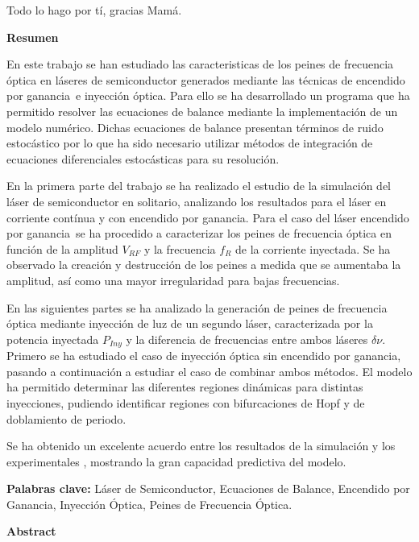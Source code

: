 \documentclass[a4paper, 11pt, oneside]{book}
\newcommand{\gs}{encendido por ganancia}
\begin{document}
				Todo lo hago por tí, gracias Mamá.

			\newpage
			\begin{center}
				\textbf{\centering Resumen}
			\end{center}

				En este trabajo se han estudiado las caracteristicas de los peines de frecuencia \'optica en l\'aseres de semiconductor generados mediante las t\'ecnicas de \gs\ e inyecci\'on \'optica. Para ello se ha desarrollado un programa que ha permitido resolver las ecuaciones de balance mediante la implementaci\'on de un modelo num\'erico. Dichas ecuaciones de balance presentan t\'erminos de ruido estoc\'astico por lo que ha sido necesario utilizar m\'etodos de integraci\'on de ecuaciones diferenciales estoc\'asticas para su resoluci\'on.

				En la primera parte del trabajo se ha realizado el estudio de la simulación del l\'aser de semiconductor en solitario, analizando los resultados para el l\'aser en corriente cont\'inua y con \gs. Para el caso del l\'aser \gs\ se ha procedido a caracterizar los peines de frecuencia \'optica en funci\'on de la amplitud $V_{RF}$ y la frecuencia $f_R$ de la corriente inyectada. Se ha observado la creaci\'on y destrucci\'on de los peines a medida que se aumentaba la amplitud, as\'i como una mayor irregularidad para bajas frecuencias.

				En las siguientes partes se ha analizado la generaci\'on de peines de frecuencia \'optica mediante inyecci\'on de luz de un segundo l\'aser, caracterizada por la potencia inyectada $P_{Iny}$ y la diferencia de frecuencias entre ambos l\'aseres $\delta\nu$. Primero se ha estudiado el caso de inyecci\'on \'optica sin \gs, pasando a continuaci\'on a estudiar el caso de combinar ambos m\'etodos. El modelo ha permitido determinar las diferentes regiones dinámicas para distintas inyecciones, pudiendo identificar regiones con bifurcaciones de Hopf y de doblamiento de periodo.

				Se ha obtenido un excelente acuerdo entre los resultados de la simulación y los experimentales \cite{Chaves19}, mostrando la gran capacidad predictiva del modelo.
		
			\begin{center}
				\textbf{Palabras clave:} L\'aser de Semiconductor, Ecuaciones de Balance, Encendido por Ganancia, Inyecci\'on \'Optica, Peines de Frecuencia \'Optica.
			\end{center}

		\newpage
			\begin{center}
				\textbf{Abstract}
			\end{center}
\end{document}
